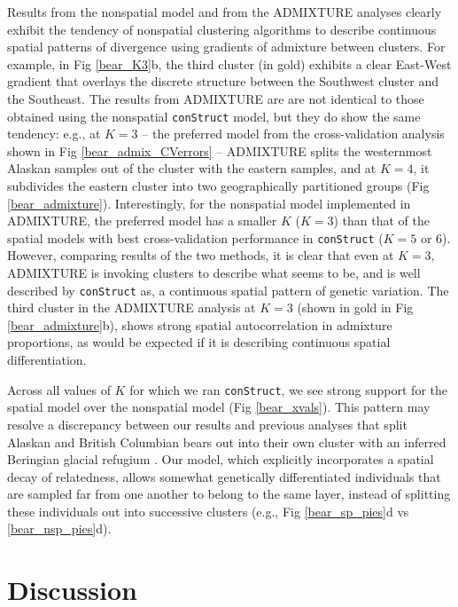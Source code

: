 \documentclass[10pt,letterpaper]{article}
\begin{document}
Results from the nonspatial model and from the ADMIXTURE analyses 
clearly exhibit the tendency of nonspatial clustering algorithms 
to describe continuous spatial patterns of divergence 
using gradients of admixture between clusters.
For example, in Fig \ref{bear_K3}b, 
the third cluster (in gold) exhibits a clear East-West gradient that 
overlays the discrete structure between the Southwest cluster and the Southeast.
The results from ADMIXTURE are are not identical to 
those obtained using the nonspatial \texttt{conStruct} model, 
but they do show the same tendency: 
e.g., at $K=3$ 
-- the preferred model from the cross-validation 
analysis shown in Fig \ref{bear_admix_CVerrors} -- 
ADMIXTURE splits the westernmost Alaskan samples 
out of the cluster with the eastern samples, 
and at $K=4$, it subdivides the eastern cluster 
into two geographically partitioned groups (Fig \ref{bear_admixture}).
Interestingly, for the nonspatial model implemented in ADMIXTURE, 
the preferred model has a smaller $K$ ($K=3$) than that of the 
spatial models with best cross-validation performance in \texttt{conStruct} ($K=5$ or 6). 
However, comparing results of the two methods, it is clear that even at $K=3$, 
ADMIXTURE is invoking clusters to describe what seems to be, 
and is well described by \texttt{conStruct} as, 
a continuous spatial pattern of genetic variation. 
The third cluster in the ADMIXTURE analysis at $K=3$ 
(shown in gold in Fig \ref{bear_admixture}b), 
shows  strong spatial autocorrelation in admixture proportions, 
as would be expected if it is describing continuous spatial differentiation.

Across all values of $K$ for which we ran \texttt{conStruct},
we see strong support for the spatial model over the nonspatial model (Fig \ref{bear_xvals}).
This pattern may resolve a discrepancy between our results and 
previous analyses that split Alaskan and British Columbian bears out 
into their own cluster with an inferred Beringian glacial refugium
\cite{Byun1997,Stone2000,Puckett2015}.
Our model, which explicitly incorporates a spatial decay of relatedness, 
allows somewhat genetically differentiated individuals 
that are sampled far from one another to belong to the same layer,
instead of splitting these individuals out into successive clusters 
(e.g., Fig \ref{bear_sp_pies}d vs \ref{bear_nsp_pies}d).

\section*{Discussion}
\end{document}
